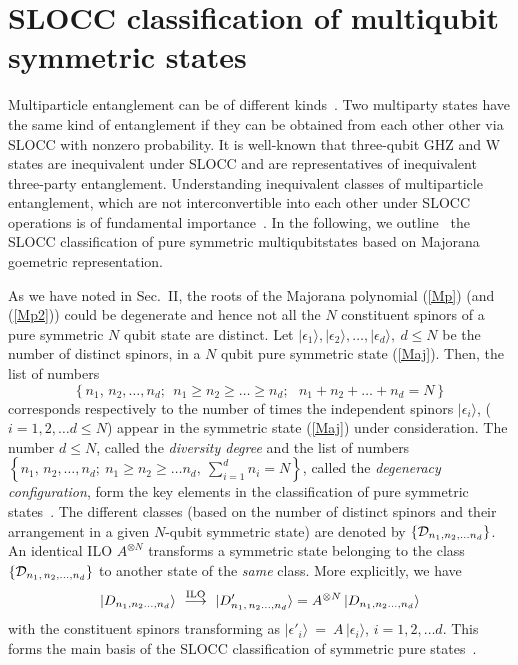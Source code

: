 \documentclass[pra,preprint,a4paper,superscriptaddress]{revtex4}
\begin{document}
{\section{SLOCC classification of multiqubit symmetric states} 
\label{classification}
Multiparticle entanglement  can be of different kinds~\cite{Dur}. Two multiparty states have the same kind of entanglement if they
can be obtained from each other other via SLOCC with nonzero probability. It is well-known that three-qubit GHZ and W states are inequivalent under SLOCC and are representatives of inequivalent three-party entanglement. Understanding  inequivalent classes of multiparticle entanglement, which are not interconvertible into each other under SLOCC operations is of fundamental importance~\cite{Dur,Ver,Lamata,solano}. In the following, we outline~\cite{solano} the SLOCC classification of pure symmetric multiqubit\normalfont states based on Majorana goemetric representation.

 As we have noted in Sec.~II,  the roots of the Majorana polynomial (\ref{Mp}) (and (\ref{Mp2})) could be degenerate  and hence not all the  $N$ constituent spinors of a pure symmetric $N$ qubit state are distinct. Let $\vert \epsilon_1\rangle, \vert \epsilon_2\rangle,\ldots, \vert \epsilon_d\rangle,\ d\leq N$ be the number of distinct spinors, in a $N$ qubit pure symmetric state (\ref{Maj}).  Then, the list of numbers $$\left\{n_1,\,n_2,\ldots ,n_d;\ \ n_1\geq n_2\geq\ldots \geq n_d; \ \ \  n_1+n_2+\ldots+n_d=N\right\}$$ 
 corresponds respectively to the number of times the independent spinors $\vert\epsilon_i\rangle$, ($i=1,2,\ldots d\leq N$) appear in the symmetric state (\ref{Maj}) under consideration. The number $d\leq N$, called the {\em diversity degree} and the list of numbers $\left\{n_1,\,n_2,\ldots ,n_d;\  n_1\geq 
n_2\geq \ldots n_d,\  \sum_{i=1}^{d} 
n_i=N\right\}$, called the {\em degeneracy configuration}, form the key elements in the classification of  pure symmetric states~\cite{solano}. The different classes  (based on the number of distinct spinors and their arrangement in a given $N$-qubit symmetric state)  are denoted by $\{{\cal D}_{n_1,n_2,\ldots n_d}\}$. 
 An identical ILO $A^{\otimes N}$ transforms a symmetric state belonging to the class $\{ {\cal D}_{n_1,\,n_2,\ldots, n_d}\}$
  to another state of the {\em same} class. More explicitly, we have 
\begin{eqnarray}
\vert D_{n_1,n_2\ldots, n_d}\rangle \ \stackrel{\rm  ILO}{\longrightarrow}\ \vert D'_{n_1,\,n_2\ldots, n_d}\rangle
={A}^{\otimes N}\,\vert D_{n_1,n_2\ldots, n_d}\rangle
\end{eqnarray}  
with the constituent spinors transforming as 
$\vert\epsilon'_i\rangle~=~A\, \vert\epsilon_i\rangle$, $i=1,2,\ldots d$. This forms the main basis of the SLOCC classification of symmetric pure 
states~\cite{solano}. 

}
\end{document}
